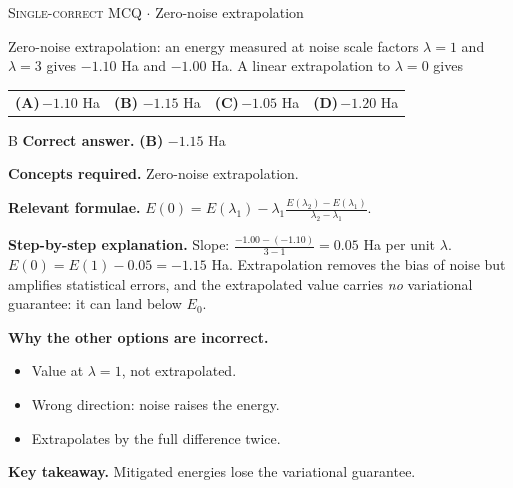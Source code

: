 \documentclass[11pt,a4paper]{article}
\newcommand{\optlabel}[1]{\textbf{(#1)}}
\newcommand{\correctlabel}[1]{\textcolor{okgreen}{\textbf{(#1)}\,\ding{51}}}
\newenvironment{qitem}[1]{\begin{list}{}{\setlength{\leftmargin}{3.3em}\setlength{\labelwidth}{3.1em}%
  \setlength{\labelsep}{0.2em}\setlength{\topsep}{3pt}\setlength{\parsep}{3pt}}\item[\textbf{Q.#1}\hfill]}{\end{list}}
\newcommand{\qsep}{\par\vspace{2pt}{\color{black!15}\hrule}\vspace{4pt}}
\newcommand{\qmeta}[2]{{\footnotesize\color{black!60}\textsc{#1} \;$\cdot$\; #2}\par}
\begin{document}
\begin{qitem}{72}
\qmeta{Single-correct MCQ}{Zero-noise extrapolation}
Zero-noise extrapolation: an energy measured at noise scale factors $\lambda = 1$ and $\lambda = 3$ gives $-1.10$ Ha and $-1.00$ Ha. A linear extrapolation to
$\lambda = 0$ gives
\par\smallskip\noindent\begin{tabularx}{\linewidth}{@{}*{4}{L}@{}}
\optlabel{A}\,$-1.10$ Ha & \correctlabel{B}\,$-1.15$ Ha & \optlabel{C}\,$-1.05$ Ha & \optlabel{D}\,$-1.20$ Ha
\end{tabularx}
\end{qitem}
\begin{solbox}{B}
\textbf{\color{brand}Correct answer.} \textcolor{okgreen}{\textbf{(B)}} $-1.15$ Ha

\textbf{\color{brand}Concepts required.} Zero-noise extrapolation.

\textbf{\color{brand}Relevant formulae.} $E(0) = E(\lambda_1) - \lambda_1\frac{E(\lambda_2) - E(\lambda_1)}{\lambda_2 - \lambda_1}$.

\textbf{\color{brand}Step-by-step explanation.} Slope: $\frac{-1.00 - (-1.10)}{3 - 1} = 0.05$ Ha per unit $\lambda$. $E(0) = E(1) - 0.05 = -1.15$ Ha. Extrapolation removes the bias of noise but amplifies
statistical errors, and the extrapolated value carries \emph{no} variational guarantee: it can land below $E_0$.

\textbf{\color{brand}Why the other options are incorrect.}
\begin{itemize}[leftmargin=2.4em, itemsep=1pt, topsep=2pt]
\item[\textbf{(A)}] Value at $\lambda = 1$, not extrapolated.
\item[\textbf{(C)}] Wrong direction: noise raises the energy.
\item[\textbf{(D)}] Extrapolates by the full difference twice.
\end{itemize}
\textbf{\color{brand}Key takeaway.} Mitigated energies lose the variational guarantee.
\end{solbox}
\qsep
\end{document}
